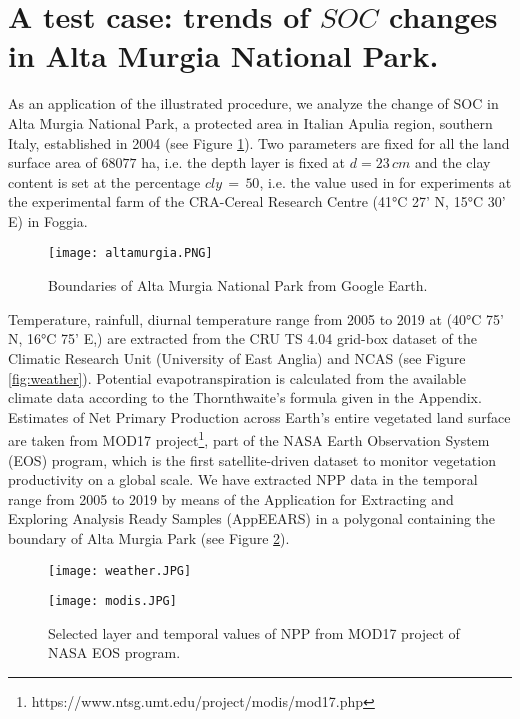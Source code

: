 \section{A test case: trends of $SOC$ changes in Alta Murgia National Park.}\label{sec:7}
As an application of the illustrated procedure, we analyze the change of SOC in Alta Murgia National Park, a protected area in Italian Apulia region, southern Italy, established in 2004 (see Figure \ref{fig:altamurgia}). Two parameters are fixed for all the land surface area of $68077$ ha, i.e. the depth layer is fixed at $d=23\, cm$ and the clay content is set  at the percentage $cly\, = \,50$, i.e. the value used in \cite{farina2013modification} for experiments at the experimental farm of the CRA-Cereal Research Centre (41\si{\celsius} 27' N, 15\si{\celsius} 30' E) in Foggia. 
\begin{figure}[t] 
\begin{center}
  \texttt{[image: altamurgia.PNG]}
  \caption{Boundaries of Alta Murgia National Park from Google Earth.}\label{fig:altamurgia}
\end{center} 
\end{figure}
 Temperature, rainfull, diurnal temperature range  from 2005 to 2019 at (40\si{\celsius} 75' N, 16\si{\celsius} 75' E,)   are extracted from the CRU TS 4.04 grid-box dataset \cite{harris2020version} of the  Climatic Research Unit (University of East Anglia) and NCAS (see Figure \ref{fig:weather}). Potential evapotranspiration is calculated from the available climate data according to the  Thornthwaite's formula given in the Appendix. Estimates of Net Primary Production  across Earth’s entire vegetated land surface are taken from  MOD17 project\footnote{https://www.ntsg.umt.edu/project/modis/mod17.php}, part of the NASA Earth Observation System (EOS) program, which is the first satellite-driven dataset \cite{running2019mod17a3hgf} to monitor vegetation productivity on a global scale. We have extracted NPP data in the temporal  range  from 2005 to 2019 by means of the Application for Extracting and Exploring Analysis Ready Samples (AppEEARS) \cite{2020appeears} in a polygonal containing the boundary of Alta Murgia Park (see Figure \ref{fig:npp}). 

\begin{figure}[h!] 
\begin{center} 
  \texttt{[image: weather.JPG]}
  \caption{Climate data at (40\si{\celsius} 75' N, 16\si{\celsius} 75' E) from CRU TS 4.04 grid-box dataset of the  Climatic Research Unit (University of East Anglia).}\label{fig:weather}
  \texttt{[image: modis.JPG]}\\ 
  \caption{Selected layer and temporal values of NPP from MOD17 project of NASA EOS program. }\label{fig:npp}  
\end{center}
\end{figure}

